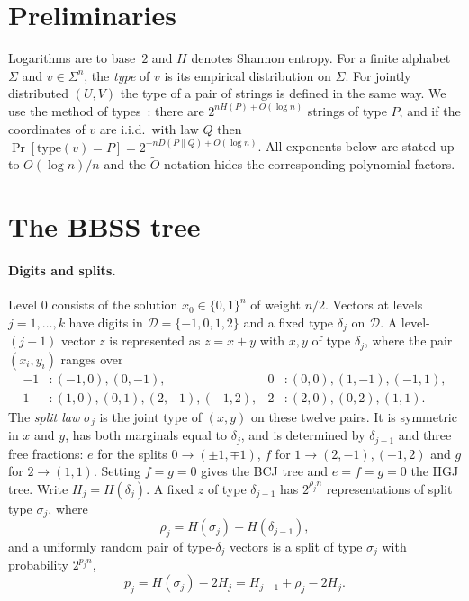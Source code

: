 \documentclass[11pt]{article}
\theoremstyle{definition}
\theoremstyle{remark}
\newcommand{\cD}{\mathcal{D}}
\newcommand{\Ot}{\widetilde{O}}
\begin{document}
\section{Preliminaries}
Logarithms are to base~$2$ and $H$ denotes Shannon entropy. For a finite alphabet $\Sigma$ and $v\in\Sigma^n$, the
\emph{type} of $v$ is its empirical distribution on $\Sigma$. For jointly distributed $(U,V)$ the type of a pair of
strings is defined in the same way. We use the method of types~\cite{CK11}: there are $2^{nH(P)+O(\log n)}$ strings
of type $P$, and if the coordinates of $v$ are i.i.d.\ with law $Q$ then
$\Pr[\text{type}(v)=P]=2^{-nD(P\|Q)+O(\log n)}$. All exponents below are stated up to $O(\log n)/n$ and the
$\Ot$ notation hides the corresponding polynomial factors.

\section{The BBSS tree}\label{sec:tree}
\paragraph{Digits and splits.} Level $0$ consists of the solution $x_0\in\{0,1\}^n$ of weight $n/2$. Vectors at
levels $j=1,\dots,k$ have digits in $\cD=\{-1,0,1,2\}$ and a fixed type $\delta_j$ on $\cD$. A level-$(j-1)$
vector $z$ is represented as $z=x+y$ with $x,y$ of type $\delta_j$, where the pair $(x_i,y_i)$ ranges over
\[
\begin{aligned}
-1&:(-1,0),(0,-1), & 0&:(0,0),(1,-1),(-1,1),\\
1&:(1,0),(0,1),(2,-1),(-1,2), & 2&:(2,0),(0,2),(1,1).
\end{aligned}
\]
The \emph{split law} $\sigma_j$ is the joint type of $(x,y)$ on these twelve pairs. It is symmetric in $x$ and $y$,
has both marginals equal to $\delta_j$, and is determined by $\delta_{j-1}$ and three free fractions: $e$ for the
splits $0\to(\pm1,\mp1)$, $f$ for $1\to(2,-1),(-1,2)$ and $g$ for $2\to(1,1)$. Setting $f=g=0$ gives the BCJ tree
and $e=f=g=0$ the HGJ tree. Write $H_j=H(\delta_j)$. A fixed $z$ of type $\delta_{j-1}$ has
$2^{\rho_jn}$ representations of split type $\sigma_j$, where
\[
\rho_j=H(\sigma_j)-H(\delta_{j-1}),
\]
and a uniformly random pair of type-$\delta_j$ vectors is a split of type $\sigma_j$ with probability $2^{p_jn}$,
\[
p_j=H(\sigma_j)-2H_j=H_{j-1}+\rho_j-2H_j.
\]
\end{document}
